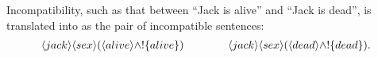 
Incompatibility, such as that between ``Jack is alive'' and ``Jack is
dead'', is translated into \cathoristic{} as the pair of incompatible
sentences:
\begin{eqnarray*}
\langle jack \rangle \langle sex \rangle (\langle alive \rangle \land ! \{alive\}) 
   \qquad\qquad
\langle jack \rangle \langle sex \rangle (\langle dead \rangle \land ! \{dead\}).
\end{eqnarray*}

